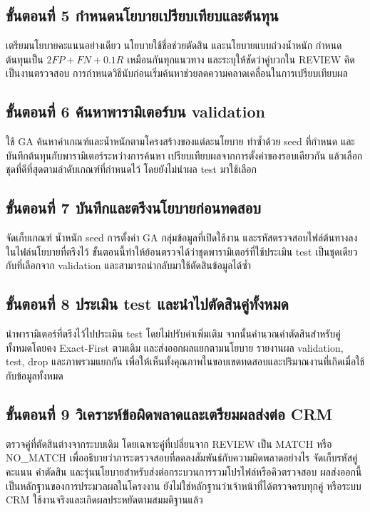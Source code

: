 \documentclass[12pt,a4paper]{report}
\begin{document}
\subsection*{ขั้นตอนที่ 5 กำหนดนโยบายเปรียบเทียบและต้นทุน}
เตรียมนโยบายคะแนนอย่างเดียว นโยบายใช้ชื่อช่วยตัดสิน และนโยบายแบบถ่วงน้ำหนัก กำหนดต้นทุนเป็น $2FP+FN+0.1R$ เหมือนกันทุกแนวทาง และระบุให้ชัดว่าคู่บวกใน REVIEW คิดเป็นงานตรวจสอบ การกำหนดวิธีนับก่อนเริ่มค้นหาช่วยลดความคลาดเคลื่อนในการเปรียบเทียบผล

\subsection*{ขั้นตอนที่ 6 ค้นหาพารามิเตอร์บน validation}
ใช้ GA ค้นหาค่าเกณฑ์และน้ำหนักตามโครงสร้างของแต่ละนโยบาย ทำซ้ำด้วย seed ที่กำหนด และบันทึกต้นทุนกับพารามิเตอร์ระหว่างการค้นหา เปรียบเทียบผลจากการตั้งค่าของรอบเดียวกัน แล้วเลือกชุดที่ดีที่สุดตามลำดับเกณฑ์ที่กำหนดไว้ โดยยังไม่นำผล test มาใช้เลือก

\subsection*{ขั้นตอนที่ 7 บันทึกและตรึงนโยบายก่อนทดสอบ}
จัดเก็บเกณฑ์ น้ำหนัก seed การตั้งค่า GA กลุ่มข้อมูลที่เปิดใช้งาน และรหัสตรวจสอบไฟล์ต้นทางลงในไฟล์นโยบายที่ตรึงไว้ ขั้นตอนนี้ทำให้ย้อนตรวจได้ว่าชุดพารามิเตอร์ที่ใช้ประเมิน test เป็นชุดเดียวกับที่เลือกจาก validation และสามารถนำกลับมาใช้ตัดสินข้อมูลได้ซ้ำ

\subsection*{ขั้นตอนที่ 8 ประเมิน test และนำไปตัดสินคู่ทั้งหมด}
นำพารามิเตอร์ที่ตรึงไว้ไปประเมิน test โดยไม่ปรับค่าเพิ่มเติม จากนั้นคำนวณคำตัดสินสำหรับคู่ทั้งหมดโดยคง Exact-First ตามเดิม และส่งออกผลแยกตามนโยบาย รายงานผล validation, test, drop และภาพรวมแยกกัน เพื่อให้เห็นทั้งคุณภาพในขอบเขตทดสอบและปริมาณงานที่เกิดเมื่อใช้กับข้อมูลทั้งหมด

\subsection*{ขั้นตอนที่ 9 วิเคราะห์ข้อผิดพลาดและเตรียมผลส่งต่อ CRM}
ตรวจคู่ที่ตัดสินต่างจากระบบเดิม โดยเฉพาะคู่ที่เปลี่ยนจาก REVIEW เป็น MATCH หรือ NO\_MATCH เพื่ออธิบายว่าภาระตรวจสอบที่ลดลงสัมพันธ์กับความผิดพลาดอย่างไร จัดเก็บรหัสคู่ คะแนน คำตัดสิน และรุ่นนโยบายสำหรับส่งต่อกระบวนการรวมโปรไฟล์หรือคิวตรวจสอบ ผลส่งออกนี้เป็นหลักฐานของการประมวลผลในโครงงาน ยังไม่ใช่หลักฐานว่าเจ้าหน้าที่ได้ตรวจครบทุกคู่ หรือระบบ CRM ใช้งานจริงและเกิดผลประหยัดตามสมมติฐานแล้ว
\end{document}
